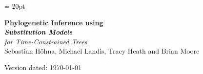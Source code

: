 \documentclass[11pt]{article}
\begin{document}
\renewcommand{\headrulewidth}{0.5pt}
\headsep = 20pt
\lhead{ }

\thispagestyle{plain}
\begin{center}

\textbf{\LARGE Phylogenetic Inference using \RevBayes}\\\vspace{2mm}
\textbf{\it{\Large Substitution Models}}\\\vspace{2mm}
{\it{\Large for Time-Constrained Trees}}\\\vspace{2mm}
\vspace{1cm}
{\Large Sebastian H{\"o}hna, Michael Landis, Tracy Heath and Brian Moore}
\vspace{1cm}
\end{center}

\def \ResourcePath {./}
\def \GlobalResourcePath {../}

%

Version dated: \today
\end{document}
